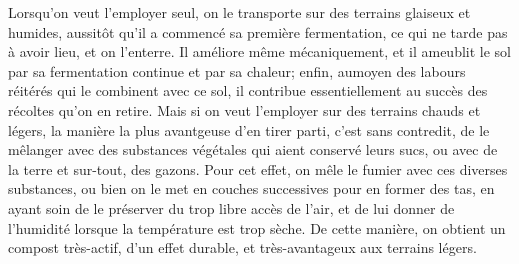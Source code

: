 Lorsqu'on veut l'employer seul, on le transporte sur des terrains glaiseux et humides, aussitôt qu'il a commencé sa première fermentation, ce qui ne tarde pas à avoir lieu, et on l'enterre. Il améliore même mécaniquement, et il ameublit le sol par sa fermentation continue et par sa chaleur; enfin, aumoyen des labours réitérés qui le combinent avec ce sol, il contribue essentiellement au succès des récoltes qu'on en retire. Mais si on veut l'employer sur des terrains chauds et légers, la manière la plus avantgeuse d'en tirer parti, c'est sans contredit, de le mêlanger avec des substances végétales qui aient conservé leurs sucs, ou avec de la terre et sur-tout, des gazons. Pour cet effet, on mêle le fumier avec ces diverses substances, ou bien on le met en couches successives pour en former des tas, en ayant soin de le préserver du trop libre accès de l'air, et\setcounter{page}{237} de lui donner de l'humidité lorsque la température est trop sèche. De cette manière, on obtient un compost très-actif, d'un effet durable, et très-avantageux aux terrains légers.
